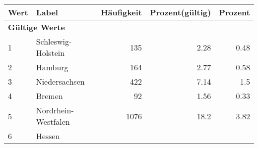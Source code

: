      \begin{longtable}{lXrrr}
     \toprule
     \textbf{Wert} & \textbf{Label} & \textbf{Häufigkeit} & \textbf{Prozent(gültig)} & \textbf{Prozent} \\
     \endhead
     \midrule
     \multicolumn{5}{l}{\textbf{Gültige Werte}}\\

     1 &
     \multicolumn{1}{X}{ Schleswig-Holstein   } &


       \num{135} &
       \num[round-mode=places,round-precision=2]{2,28} &
         \num[round-mode=places,round-precision=2]{0,48} \\

     2 &
     \multicolumn{1}{X}{ Hamburg   } &


       \num{164} &
       \num[round-mode=places,round-precision=2]{2,77} &
         \num[round-mode=places,round-precision=2]{0,58} \\

     3 &
     \multicolumn{1}{X}{ Niedersachsen   } &


       \num{422} &
       \num[round-mode=places,round-precision=2]{7,14} &
         \num[round-mode=places,round-precision=2]{1,5} \\

     4 &
     \multicolumn{1}{X}{ Bremen   } &


       \num{92} &
       \num[round-mode=places,round-precision=2]{1,56} &
         \num[round-mode=places,round-precision=2]{0,33} \\

     5 &
     \multicolumn{1}{X}{ Nordrhein-Westfalen   } &


       \num{1076} &
       \num[round-mode=places,round-precision=2]{18,2} &
         \num[round-mode=places,round-precision=2]{3,82} \\

     6 &
     \multicolumn{1}{X}{ Hessen   } &



\end{longtable}
